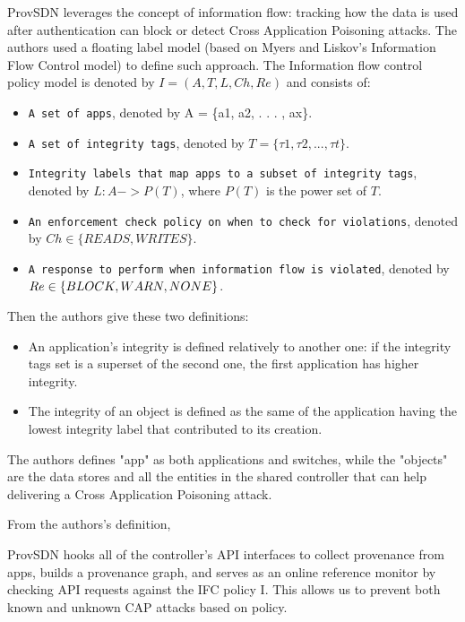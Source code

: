 \documentclass[a4paper,10pt]{memoir}
\begin{document}
ProvSDN leverages the concept of information flow: tracking how the data is used after authentication can block or detect Cross Application Poisoning attacks. The authors used a floating label model (based on Myers and Liskov’s Information Flow Control model) to define such approach. The Information flow control policy model is denoted by $I = (A,T, L,Ch, Re)$ and consists of:
\begin{itemize}
    \item\texttt{A set of apps}, denoted by A = \{a1, a2, . . . , ax\}.
    \item\texttt{A set of integrity tags}, denoted by $T = \{\tau1, \tau2, . . . , \tau t\}$.
    \item\texttt{Integrity labels that map apps to a subset of integrity tags}, denoted by $L : A -> P(T)$, where $P(T)$ is the power set of $T$.
    \item\texttt{An enforcement check policy on when to check for violations}, denoted by $Ch \in \{READS, WRITES\}$.
    \item\texttt{A response to perform when information flow is violated}, denoted by $Re \in \\\{BLOCK, WARN, NONE\}$.
\end{itemize}

Then the authors give these two definitions:
\begin{itemize}
    \item An application's integrity is defined relatively to another one: if the integrity tags set is a superset of the second one, the first application has higher integrity.
    \item The integrity of an object is defined as the same of the application having the lowest integrity label that contributed to its creation.
\end{itemize}

The authors defines "app" as both applications and switches, while the "objects" are the data stores and all the entities in the shared controller that can help delivering a Cross Application Poisoning attack. 

From the authors's definition, 
\begin{quoting}[font=itshape, begintext={"}, endtext={"}]
ProvSDN hooks all of the controller’s API interfaces to collect provenance from apps, builds a provenance graph, and serves as an online reference monitor by checking API requests against the IFC policy I. This allows us to prevent both known and unknown CAP attacks based on policy.
\end{quoting}
\end{document}
